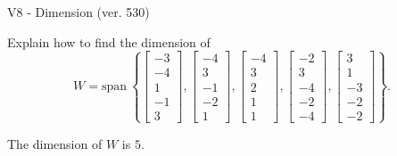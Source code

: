 \begin{exercise}
  \begin{exerciseTitle}V8 - Dimension (ver. 530)\end{exerciseTitle}
  \begin{exerciseStatement}
    Explain how to find the dimension of 
\[W=\mathrm{span}\ \left\{\left[\begin{array}{r}
-3 \\
-4 \\
1 \\
-1 \\
3
\end{array}\right] , \left[\begin{array}{r}
-4 \\
3 \\
-1 \\
-2 \\
1
\end{array}\right] , \left[\begin{array}{r}
-4 \\
3 \\
2 \\
1 \\
1
\end{array}\right] , \left[\begin{array}{r}
-2 \\
3 \\
-4 \\
-2 \\
-4
\end{array}\right] , \left[\begin{array}{r}
3 \\
1 \\
-3 \\
-2 \\
-2
\end{array}\right]\right\}.\]



  \end{exerciseStatement}
  \begin{exerciseAnswer}
   The dimension of \(W\) is  \(5\).
  


  \end{exerciseAnswer}
\end{exercise}